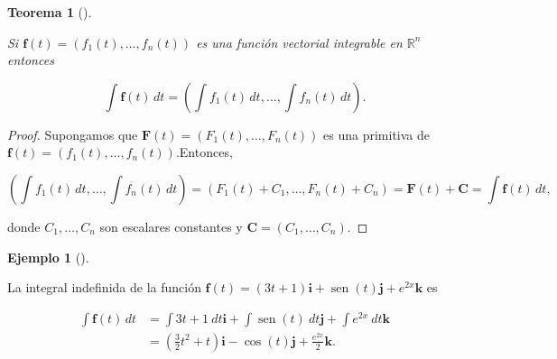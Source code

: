 \documentclass[
  a4paper,
]{scrreport}
\theoremstyle{definition}
\theoremstyle{plain}
\newtheorem{theorem}{Teorema}[chapter]
\theoremstyle{plain}
\theoremstyle{definition}
\theoremstyle{definition}
\newtheorem{example}{Ejemplo}[chapter]
\theoremstyle{plain}
\theoremstyle{remark}
\begin{document}
\begin{theorem}[]\protect\hypertarget{thm-integral-indefinida-funcion-vectorial}{}\label{thm-integral-indefinida-funcion-vectorial}

Si \(\mathbf{f}(t)=(f_1(t), \ldots, f_n(t))\) es una función vectorial
integrable en \(\mathbb{R}^n\) entonces

\[
\int \mathbf{f}(t)\, dt = \left(\int f_1(t)\, dt, \ldots, \int f_n(t)\,dt\right).
\]

\end{theorem}

\begin{tcolorbox}[enhanced jigsaw, breakable, title=\textcolor{quarto-callout-note-color}{\faInfo}\hspace{0.5em}{Demostración}, toprule=.15mm, coltitle=black, arc=.35mm, rightrule=.15mm, colframe=quarto-callout-note-color-frame, colbacktitle=quarto-callout-note-color!10!white, toptitle=1mm, titlerule=0mm, leftrule=.75mm, opacityback=0, colback=white, bottomrule=.15mm, bottomtitle=1mm, left=2mm, opacitybacktitle=0.6]

\begin{proof}

Supongamos que \(\mathbf{F}(t)=(F_1(t),\ldots,F_n(t))\) es una primitiva
de \(\mathbf{f}(t)=(f_1(t), \ldots, f_n(t))\).Entonces,

\[
\left(\int f_1(t)\, dt, \ldots, \int f_n(t)\,dt\right) 
= (F_1(t)+C_1,\ldots, F_n(t)+C_n)
= \mathbf{F}(t)+\mathbf{C} = \int \mathbf{f}(t)\, dt,
\]

donde \(C_1,\ldots,C_n\) son escalares constantes y
\(\mathbf{C}=(C_1,\ldots, C_n)\).

\end{proof}

\end{tcolorbox}

\begin{example}[]\protect\hypertarget{exm-integral-indefinida-funcion-vectorial}{}\label{exm-integral-indefinida-funcion-vectorial}

La integral indefinida de la función
\(\mathbf{f}(t) = (3t+1) \mathbf{i} + \operatorname{sen}(t) \mathbf{j} + e^{2x} \mathbf{k}\)
es

\begin{align*}
\int \mathbf{f}(t)\, dt
&= \int 3t+1\ dt \mathbf{i} + \int \operatorname{sen}(t)\ dt \mathbf{j} + \int e^{2x}\ dt \mathbf{k} \\
&= \left(\frac{3}{2}t^2+t\right) \mathbf{i} - \cos(t) \mathbf{j} + \frac{e^{2x}}{2} \mathbf{k}.
\end{align*}

\end{example}
\end{document}
